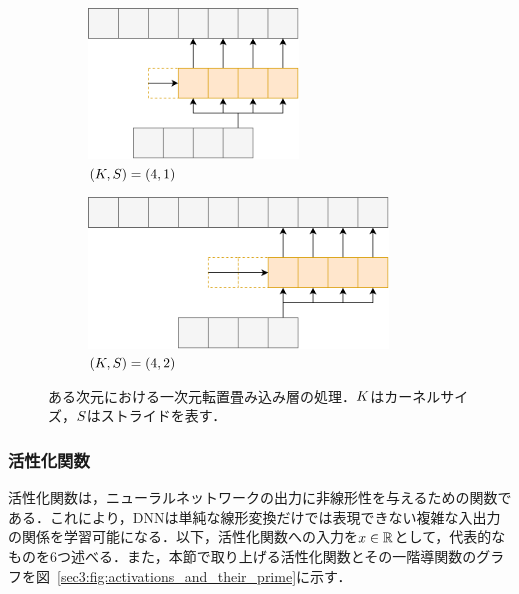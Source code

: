 \begin{figure}[tb]
    \centering
    \begin{subfigure}[b]{0.48\textwidth}
        \centering
        \includegraphics[height=4cm]{./figure/sec3/tconv1.drawio.png}
        \caption{$\left(K, S\right) = \left(4, 1\right)$}
        \label{sec3:fig:tconv1}
    \end{subfigure}
    \begin{subfigure}[b]{0.48\textwidth}
        \centering
        \includegraphics[height=4cm]{./figure/sec3/tconv2.drawio.png}
        \caption{$\left(K, S\right) = \left(4, 2\right)$}
        \label{sec3:fig:tconv2}
    \end{subfigure}
    \caption{ある次元における一次元転置畳み込み層の処理．$K$はカーネルサイズ，$S$はストライドを表す．}
    \label{sec3:fig:tconv_variations}
\end{figure}

\subsubsection{活性化関数}
活性化関数は，ニューラルネットワークの出力に非線形性を与えるための関数である．これにより，DNNは単純な線形変換だけでは表現できない複雑な入出力の関係を学習可能になる．以下，活性化関数への入力を$x \in \mathbb{R}$として，代表的なものを6つ述べる．また，本節で取り上げる活性化関数とその一階導関数のグラフを図~\ref{sec3:fig:activations_and_their_prime}に示す．

